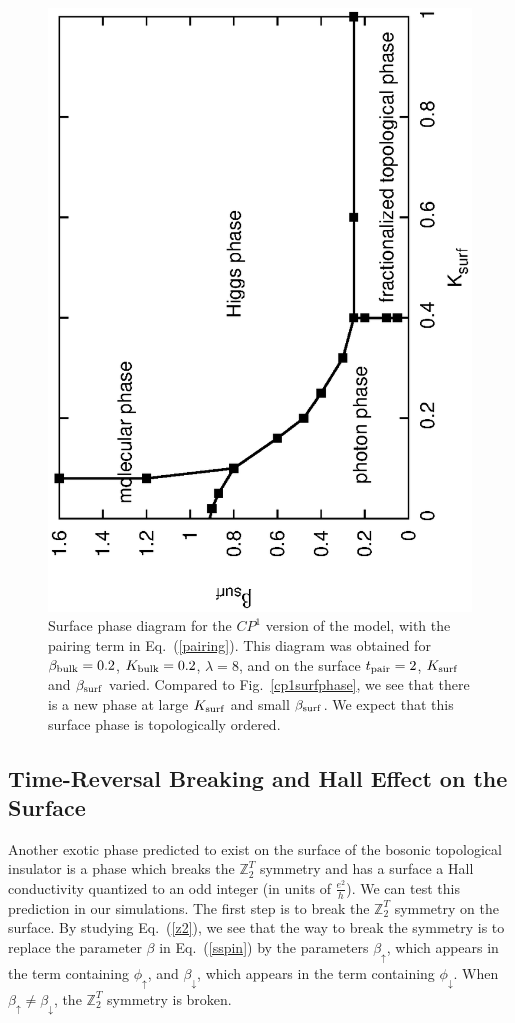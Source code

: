 \documentclass[prb,twocolumn]{revtex4-1}
\def\ztwot{\mathbb{Z}_2^T}
\begin{document}
\begin{figure}
\includegraphics[angle=-90,width=0.9\linewidth]{figures/cp1surfacepairing.eps}
\caption{Surface phase diagram for the $CP^1$ version of the model, with the pairing term in Eq.~(\ref{pairing}). This diagram was obtained for $\beta_{\rm bulk}=0.2$, $K_{\rm bulk}=0.2$, $\lambda=8$, and on the surface $t_{\rm pair}=2$, $K_{\rm surf}$ and $\beta_{\rm surf}$ varied. Compared to Fig.~\ref{cp1surfphase}, we see that there is a new phase at large $K_{\rm surf}$ and small $\beta_{\rm surf}$. We expect that this surface phase is topologically ordered.  }
\label{cp1surfpair}
\end{figure}

\subsection{Time-Reversal Breaking and Hall Effect on the Surface}

Another exotic phase predicted to exist on the surface of the bosonic topological insulator is a phase which breaks the $\ztwot$ symmetry and has a surface a Hall conductivity quantized to an odd integer (in units of $\frac{e^2}{h}$).\cite{SenthilVishwanath} We can test this prediction in our simulations. The first step is to break the $\ztwot$ symmetry on the surface. By studying Eq.~(\ref{z2}), we see that the way to break the symmetry is to replace the parameter $\beta$ in Eq.~(\ref{sspin}) by the parameters $\beta_\uparrow$, which appears in the term containing $\phi_\uparrow$, and $\beta_\downarrow$, which appears in the term containing $\phi_\downarrow$. When $\beta_\uparrow\neq\beta_\downarrow$, the $\ztwot$ symmetry is broken.
\end{document}
